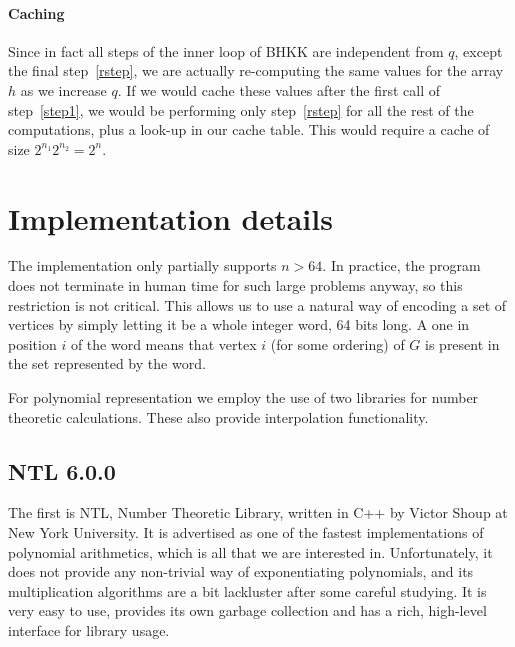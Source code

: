 \documentclass[a4paper]{article}
\begin{document}
\paragraph{Caching} Since in fact all steps of the inner loop of BHKK are independent from $q$, except the final step~\ref{rstep}, we are actually re-computing the same values for the array $h$ as we increase $q$. If we would cache these values after the first call of step~\ref{step1}, we would be performing only step~\ref{rstep} for all the rest of the computations, plus a look-up in our cache table. This would require a cache of size $2^{n_1} 2^{n_2} = 2^n$.


\section{Implementation details}
The implementation only partially supports $n > 64$. In practice, the program does not terminate in human time for such large problems anyway, so this restriction is not critical. This allows us to use a natural way of encoding a set of vertices by simply letting it be a whole integer word, 64 bits long. A one in position $i$ of the word means that vertex $i$ (for some ordering) of $G$ is present in the set represented by the word.


For polynomial representation we employ the use of two libraries for number theoretic calculations. These also provide interpolation functionality.

\subsection{NTL 6.0.0}
The first is NTL, Number Theoretic Library, written in C++ by Victor Shoup at New York University\cite{ntl}. It is advertised as one of the fastest implementations of polynomial arithmetics, which is all that we are interested in. Unfortunately, it does not provide any non-trivial way of exponentiating polynomials, and its multiplication algorithms are a bit lackluster after some careful studying. It is very easy to use, provides its own garbage collection and has a rich, high-level interface for library usage.
\end{document}

